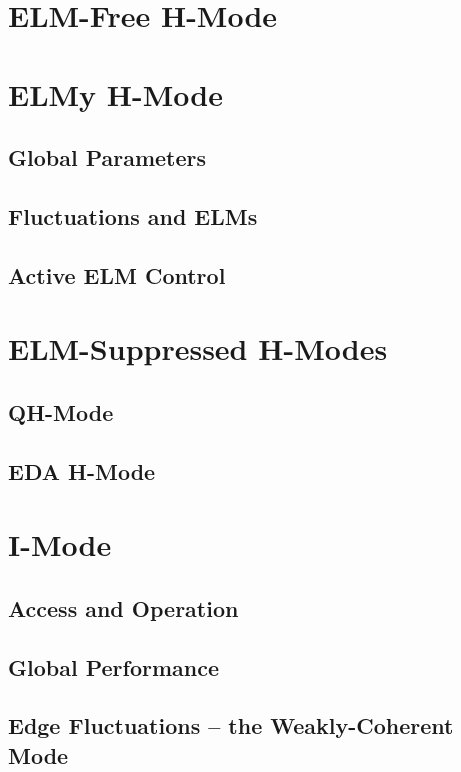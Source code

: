 \section{ELM-Free H-Mode}\label{sec:hcr_elmfree}

\nicesectionending

\section{ELMy H-Mode}\label{sec:hcr_elmy}

\subsection{Global Parameters}\label{subsec:hcr_elmy_ped}

\subsection{Fluctuations and ELMs}\label{subsec:hcr_elmy_fluct}

\subsection{Active ELM Control}\label{subsec:hcr_elmy_control}

\nicesectionending

\section{ELM-Suppressed H-Modes}\label{sec:hcr_elmsuppressed}

\subsection{QH-Mode}\label{subsec:hcr_qh}

\subsection{EDA H-Mode}\label{subsec:hcr_eda}

\nicesectionending

\section{I-Mode}\label{sec:hcr_imode}

\subsection{Access and Operation}\label{subsec:hcr_imode_access}

\subsection{Global Performance}\label{subsec:hcr_imode_performance}

\subsection{Edge Fluctuations -- the Weakly-Coherent Mode}\label{subsec:hcr_imode_wcm}

\nicechapterending



